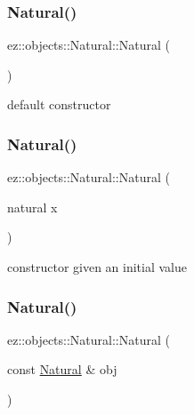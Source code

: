 \subsubsection{\texorpdfstring{Natural()}{Natural()}\hspace{0.1cm}{\footnotesize\ttfamily [1/3]}}
{\footnotesize\ttfamily ez\+::objects\+::\+Natural\+::\+Natural (\begin{DoxyParamCaption}{ }\end{DoxyParamCaption})\hspace{0.3cm}{\ttfamily [inline]}}

default constructor \mbox{\label{classez_1_1objects_1_1Natural_a851dc0dec8710296e68c29f886b26bd9}} 
\subsubsection{\texorpdfstring{Natural()}{Natural()}\hspace{0.1cm}{\footnotesize\ttfamily [2/3]}}
{\footnotesize\ttfamily ez\+::objects\+::\+Natural\+::\+Natural (\begin{DoxyParamCaption}\item[{natural}]{x }\end{DoxyParamCaption})\hspace{0.3cm}{\ttfamily [inline]}}

constructor given an initial value \mbox{\label{classez_1_1objects_1_1Natural_a7f8e9004d3de3fac88d0341bc299a399}} 
\subsubsection{\texorpdfstring{Natural()}{Natural()}\hspace{0.1cm}{\footnotesize\ttfamily [3/3]}}
{\footnotesize\ttfamily ez\+::objects\+::\+Natural\+::\+Natural (\begin{DoxyParamCaption}\item[{const \hyperlink{classez_1_1objects_1_1Natural}{Natural} \&}]{obj }\end{DoxyParamCaption})\hspace{0.3cm}{\ttfamily [inline]}}

